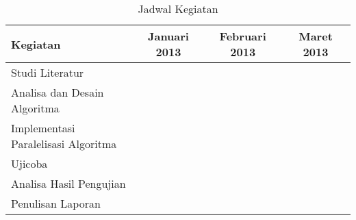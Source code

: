 \chapter{\babTiga}


\begin{table}
    \caption{Jadwal Kegiatan}
    \centering
    \begin{tabular}{|l|c|c|c|c|c|c|c|c|c|c|c|c|}
        \hline
        Kegiatan & \multicolumn{4}{|c|}{Januari 2013} & \multicolumn{4}{|c|}{Februari 2013} & \multicolumn{4}{|c|}{Maret 2013} \\ \hline
        Studi Literatur        & \cellcolor{gray!25} & \cellcolor{gray!25} & \cellcolor{gray!25} & ~ & ~             & ~ & ~ & ~ & ~          & ~ & ~ & ~ \\ \hline
        Analisa dan Desain Algoritma        & ~            & ~ & ~ & ~ & ~             & ~ & ~ & ~ & ~          & ~ & ~ & ~ \\ \hline
        Implementasi Paralelisasi Algoritma        & ~            & ~ & ~ & ~ & ~             & ~ & ~ & ~ & ~          & ~ & ~ & ~ \\ \hline
        Ujicoba        & ~            & ~ & ~ & ~ & ~             & ~ & ~ & ~ & ~          & ~ & ~ & ~ \\ \hline
        Analisa Hasil Pengujian        & ~            & ~ & ~ & ~ & ~             & ~ & ~ & ~ & ~          & ~ & ~ & ~ \\ \hline
        Penulisan Laporan        & ~            & ~ & ~ & ~ & ~             & ~ & ~ & ~ & ~          & ~ & ~ & ~ \\
        \hline
    \end{tabular}
\end{table}
